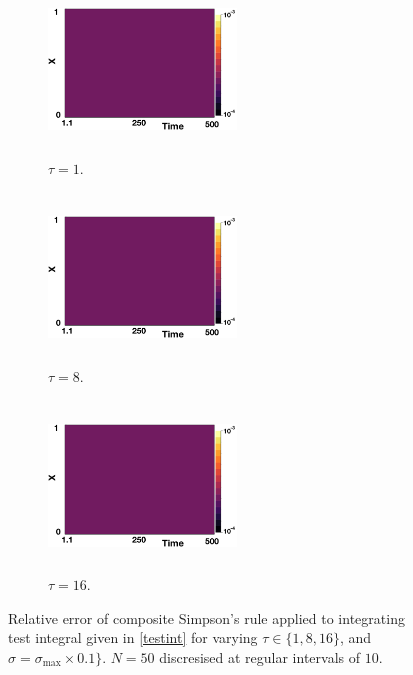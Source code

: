 \begin{figure}[H]
    \centering
    \begin{subfigure}[t]{0.32\textwidth}
        \centering
        \includegraphics[width=5cm,height=4.5cm]{disterr.png}
        \caption{$\tau=1$.}
        \label{}
    \end{subfigure}
    \hfill
    \begin{subfigure}[t]{0.32\textwidth}
        \centering
        \includegraphics[width=5cm,height=4.5cm]{disterr.png}
        \caption{$\tau=8$.}
        \label{}
    \end{subfigure}
    \hfill
    \begin{subfigure}[t]{0.32\textwidth}
        \centering
        \includegraphics[width=5cm,height=4.5cm]{disterr.png}
        \caption{$\tau=16$.}
        \label{}
    \end{subfigure}
    \caption{Relative error of composite Simpson's rule applied to integrating test integral given in \eqref{testint} for varying $\tau\in\{1,8,16\}$, and $\sigma=\sigma_{\max}\times0.1\}$. $N=50$ discresised at regular intervals of $10$.}
    \label{fig:tempquad}
\end{figure}

